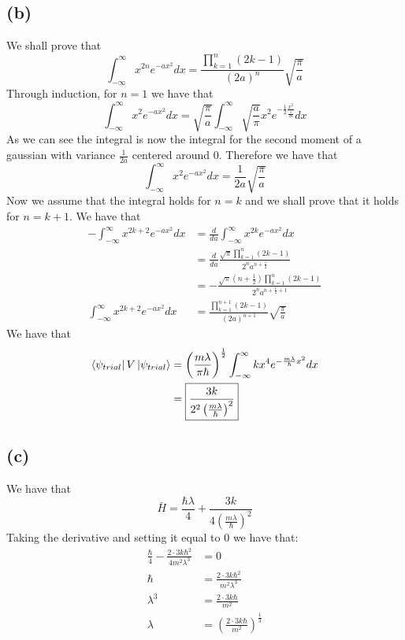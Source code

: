 \documentclass[11pt]{article}
\begin{document}
\subsection*{(b)}
We shall prove that 
$$\int_{-\infty}^{\infty} x^{2n}e^{-ax^2}dx = \frac{\prod_{k=1}^n (2k-1)}{(2a)^n}\sqrt{\frac{\pi}{a}}$$
Through induction, for $n=1$ we have that 
$$\int_{-\infty}^{\infty} x^{2}e^{-ax^2}dx =\sqrt{\frac{\pi}{a}}\int_{-\infty}^{\infty} \sqrt{\frac{a}{\pi}}x^{2}e^{-\frac{1}{2}\frac{x^2}{\frac{1}{2a}}}dx $$
As we can see the integral is now the integral for the second moment of a gaussian with variance 
$\frac{1}{2a}$ centered around 0. Therefore we have that 
$$\int_{-\infty}^{\infty} x^{2}e^{-ax^2}dx =\frac{1}{2a}\sqrt{\frac{\pi}{a}}$$
Now we assume that the integral holds for $n=k$ and we shall prove that it holds for $n=k+1$.
We have that
\begin{align*}
    -\int_{-\infty}^{\infty} x^{2k+2}e^{-ax^2}dx &= \frac{d}{da}\int_{-\infty}^{\infty} x^{2k}e^{-ax^2}dx\\
    &= \frac{d}{da}\frac{\sqrt{\pi}\prod_{k=1}^n (2k-1)}{2^na^{n+\frac{1}{2}}}\\
    &= -\frac{\sqrt{\pi}(n+\frac{1}{2})\prod_{k=1}^n (2k-1)}{2^na^{n+\frac{1}{2}+1}}\\
    \int_{-\infty}^{\infty} x^{2k+2}e^{-ax^2}dx&= \boxed{\frac{\prod_{k=1}^{n+1} (2k-1)}{(2a)^{n+1}}\sqrt{\frac{\pi}{a}}}
\end{align*}
We have that 
\begin{align*}
    \bra{\psi_{trial}}V\ket{\psi_{trial}} &= \left(\frac{m\lambda}{\pi\hbar}\right)^\frac{1}{2} \int_{-\infty}^{\infty} kx^4 e^{-\frac{m\lambda}{\hbar}x^2}dx\\
    &= \boxed{\frac{3k}{2^2\left(\frac{m\lambda}{\hbar}\right)^2}}\\
\end{align*}
\subsection*{(c)}
We have that 
$$\bar{H} = \frac{\hbar \lambda}{4}+\frac{3k}{4\left(\frac{m\lambda}{\hbar}\right)^2}$$
Taking the derivative and setting it equal to 0 we have that:
\begin{align*}
    \frac{\hbar}{4} - \frac{2\cdot3k\hbar^2}{4m^2\lambda^3} &= 0\\
    \hbar &= \frac{2\cdot3k\hbar^2}{m^2\lambda^3}\\
    \lambda^3 &= \frac{2\cdot3k\hbar}{m^2}\\
    \lambda &= \boxed{\left(\frac{2\cdot3k\hbar}{m^2}\right)^\frac{1}{3}}
\end{align*}
\end{document}
